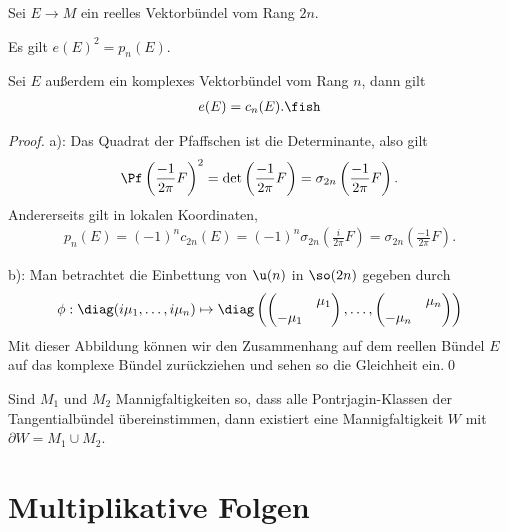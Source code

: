 \documentclass[%
	paper=a5,%
	fleqn,%
	DIV=18,%
	BCOR=0mm,
	fontsize=11pt,
	titlepage=false,%
	bibliography=totoc,
	DIV=18,%
	twoside=true,
	pdftitle=Riemannsche Geometrie,
	pdfauthor=Uwe Semmelmann,
	numbers=noendperiod]%
	{scrbook}
\begin{document}
\begin{lem}
Sei $E\to M$ ein reelles Vektorbündel vom Rang $2n$.
\begin{propenum}
\item Es gilt $e(E)^2 = p_{n}(E)$.
\item Sei $E$ außerdem ein komplexes Vektorbündel vom Rang $n$, dann gilt
\begin{align*}
e(E) = c_{n}(E).\fish
\end{align*}
\end{propenum}
\end{lem}
\begin{proof}
a): Das Quadrat der Pfaffschen ist die Determinante, also gilt
\begin{align*}
\Pf\left(\frac{-1}{2\pi}F\right)^2 = 
\det\left(\frac{-1}{2\pi}F\right) = \sigma_{2n}\left(\frac{-1}{2\pi}F\right).
\end{align*}
Andererseits gilt in lokalen Koordinaten,
\begin{align*}
p_{n}(E) = (-1)^n c_{2n}(E) = 
(-1)^n \sigma_{2n}\left( \frac{i}{2\pi}F\right)
= \sigma_{2n}\left( \frac{-1}{2\pi}F\right).
\end{align*}

b): Man betrachtet die Einbettung von $\u(n)$ in $\so(2n)$ gegeben durch
\begin{align*}
\phi: \diag(i\mu_{1},\ldots,i\mu_{n}) \mapsto
\diag
\left(
\begin{pmatrix}
& \mu_{1}\\
-\mu_{1}
\end{pmatrix},
\ldots,
\begin{pmatrix}
& \mu_{n}\\
-\mu_{n}
\end{pmatrix}
\right)
\end{align*}
Mit dieser Abbildung können wir den Zusammenhang auf dem reellen Bündel $E$ auf das komplexe Bündel zurückziehen und sehen so die Gleichheit ein.\qed
\end{proof}

\begin{rem}
Sind $M_{1}$ und $M_{2}$ Mannigfaltigkeiten so, dass alle Pontrjagin-Klassen der Tangentialbündel übereinstimmen, dann existiert eine Mannigfaltigkeit $W$ mit $\partial W = M_{1}\cup M_{2}$.\map
\end{rem}

\section{Multiplikative Folgen}
\end{document}

